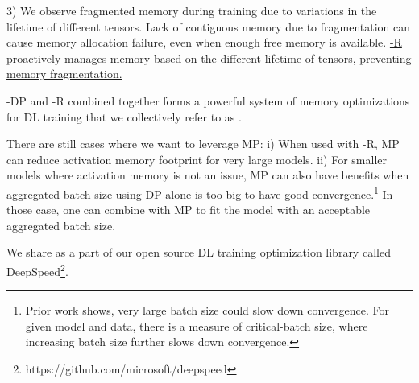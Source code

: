 3) We observe fragmented memory during training due to variations in the lifetime of different tensors. Lack of contiguous memory due to fragmentation can cause memory allocation failure, even when enough free memory is available. \uline{\name-R proactively manages memory based on the different lifetime of tensors, preventing memory fragmentation.}

\name-DP and \name-R combined together forms a powerful system of memory optimizations for DL training that we collectively refer to as \name.

There are still cases where we want to leverage MP: i) When used with \name-R, MP can reduce activation memory footprint for very large models. ii) For smaller models where activation memory is not an issue, MP can also have benefits when aggregated batch size using DP alone is too big to have good convergence.\footnote{Prior work \cite{DBLP:journals/corr/batch-scaling} shows, very large batch size could slow down convergence.  For given model and data, there is a measure of critical-batch size, where increasing batch size further slows down convergence.}  In those case, one can combine \name with MP to fit the model with an acceptable aggregated batch size.

We share \name as a part of our open source DL training optimization library called DeepSpeed\footnote{https://github.com/microsoft/deepspeed}.